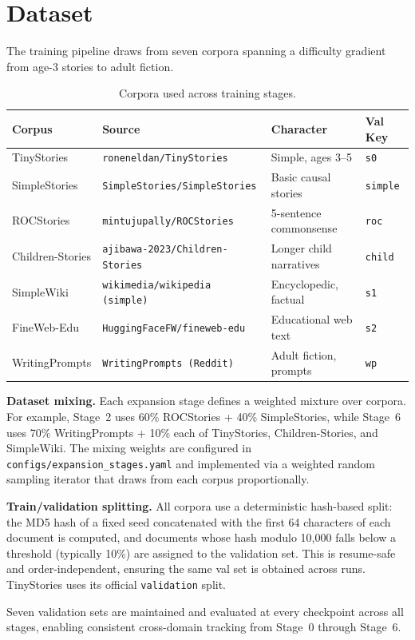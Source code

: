 \section{Dataset}

The training pipeline draws from seven corpora spanning a difficulty gradient
from age-3 stories to adult fiction.

\begin{table}[H]
\centering\small
\caption{Corpora used across training stages.}
\begin{tabular}{llll}
\toprule
\textbf{Corpus} & \textbf{Source} & \textbf{Character} & \textbf{Val Key} \\
\midrule
TinyStories       & \texttt{roneneldan/TinyStories}         & Simple, ages 3--5      & \texttt{s0}     \\
SimpleStories     & \texttt{SimpleStories/SimpleStories}    & Basic causal stories   & \texttt{simple} \\
ROCStories        & \texttt{mintujupally/ROCStories}        & 5-sentence commonsense & \texttt{roc}    \\
Children-Stories  & \texttt{ajibawa-2023/Children-Stories}   & Longer child narratives& \texttt{child}  \\
SimpleWiki        & \texttt{wikimedia/wikipedia (simple)}   & Encyclopedic, factual  & \texttt{s1}     \\
FineWeb-Edu       & \texttt{HuggingFaceFW/fineweb-edu}      & Educational web text   & \texttt{s2}     \\
WritingPrompts    & \texttt{WritingPrompts (Reddit)}        & Adult fiction, prompts & \texttt{wp}     \\
\bottomrule
\end{tabular}
\label{tab:corpora}
\end{table}

\textbf{Dataset mixing.}
Each expansion stage defines a weighted mixture over corpora.
For example, Stage~2 uses 60\% ROCStories + 40\% SimpleStories, while Stage~6
uses 70\% WritingPrompts + 10\% each of TinyStories, Children-Stories, and
SimpleWiki.  The mixing weights are configured in
\texttt{configs/expansion\_stages.yaml} and implemented via a weighted random
sampling iterator that draws from each corpus proportionally.

\textbf{Train/validation splitting.}
All corpora use a deterministic hash-based split: the MD5 hash of a fixed seed
concatenated with the first 64 characters of each document is computed, and
documents whose hash modulo 10{,}000 falls below a threshold (typically 10\%)
are assigned to the validation set.  This is resume-safe and order-independent,
ensuring the same val set is obtained across runs.  TinyStories uses its
official \texttt{validation} split.

Seven validation sets are maintained and evaluated at every checkpoint across
all stages, enabling consistent cross-domain tracking from Stage~0 through
Stage~6.

